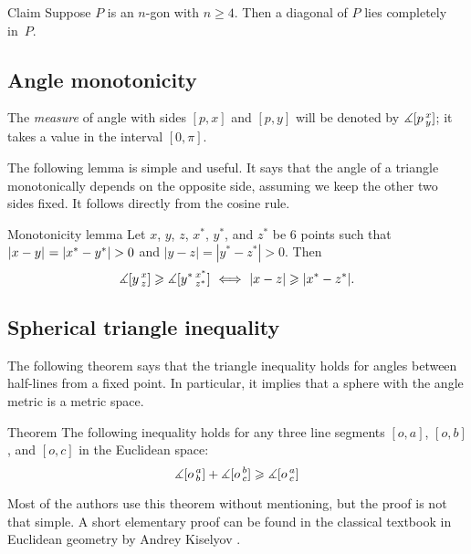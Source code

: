 \begin{multicols}{2}
{\begin{thm}{Claim}
Suppose $P$ is an $n$-gon with $n\ge 4$.
Then a diagonal of $P$ lies completely in~$P$.
\end{thm}



\subsection*{Angle monotonicity}

The {}\emph{measure} of angle with sides $[p,x]$ and $[p,y]$ will be denoted by $\measuredangle[p\,{}^{x}_{y}]$;
it takes a value in the interval $[0,\pi]$.

The following lemma is simple and useful.
It says that the angle of a triangle monotonically depends on the opposite side, assuming we keep the other two sides fixed.
It follows directly from the cosine rule.

\begin{thm}{Monotonicity lemma}\label{lem:angle-monotonicity}
Let $x$, $y$, $z$, $x^{*}$, $y^{*}$, and $z^{*}$ be 6 points such that $\dist{x}{y}{}\z=|x^{*}-y^{*}|>0$ and $|y-z|=|y^{*}-z^{*}|>0$.
Then 
\[\measuredangle[y\,{}^{x}_{z}]
\geqslant
\measuredangle[y^{*}\,{}^{x^{*}}_{z^{*}}]
\ \Longleftrightarrow\
|x-z|\geqslant |x^{*}-z^{*}|.\]
\end{thm}

\subsection*{Spherical triangle inequality}

The following theorem says that the triangle inequality holds for angles between half-lines from a fixed point.
In particular, it implies that a sphere with the angle metric is a metric space.

\begin{thm}{Theorem}\label{thm:spherical-triangle-inq}
The following inequality holds for any three line segments $[o,a]$, $[o,b]$, and $[o,c]$ in the Euclidean space:
\[\measuredangle[o\,{}^{a}_{b}]
+
\measuredangle[o\,{}^{b}_{c}]
\geqslant
\measuredangle[o\,{}^{a}_{c}]\]

\end{thm}

Most of the authors use this theorem without mentioning, but the proof is not that simple.
A short elementary proof can be found in the classical textbook in Euclidean geometry by Andrey Kiselyov \cite[\S 47]{kiselyov}.


}
\end{multicols}
